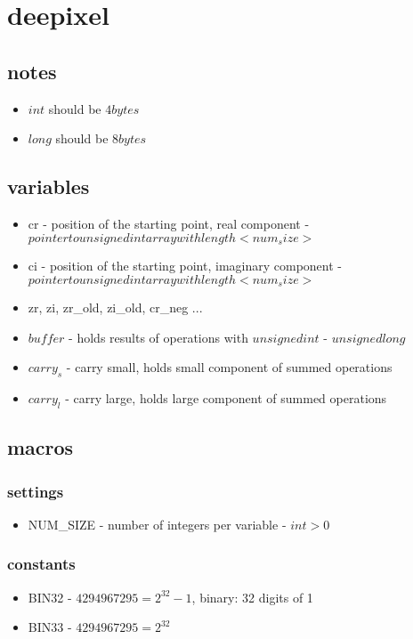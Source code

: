 \chapter{deepixel}
\section{notes}
\begin{itemize}
  \item $int$ should be $4 bytes$
  \item $long$ should be $8 bytes$
\end{itemize}
\section{variables}
\begin{itemize}
  \item cr - position of the starting point, real component - $pointer to unsigned int array with length <num_size>$
  \item ci - position of the starting point, imaginary component - $pointer to unsigned int array with length <num_size>$
  \item zr, zi, zr_old, zi_old, cr_neg ...
  \item $buffer$ - holds results of operations with $unsigned int$ - $unsigned long$
  \item $carry_s$ - carry small, holds small component of summed operations
  \item $carry_l$ - carry large, holds large component of summed operations
\end{itemize}

\section{macros}
\subsection{settings}
\begin{itemize}
  \item NUM_SIZE - number of integers per variable - $int > 0$
\end{itemize}

\subsection{constants}
\begin{itemize}
  \item BIN32 - $4294967295 = 2^32-1$, binary: 32 digits of 1
  \item BIN33 - $4294967295 = 2^32$
\end{itemize}

